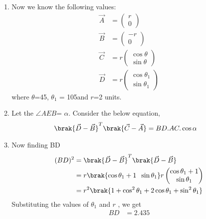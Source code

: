 \renewcommand{\theequation}{\theenumi}
\begin{enumerate}[label=\thesection.\arabic*.,ref=\thesection.\theenumi]
\item Now we know the following values:
\begin{align}
\vec{A} &= \begin{pmatrix}r\\0 \end{pmatrix} \\
\vec{B} &= \begin{pmatrix}-r\\0 \end{pmatrix} \\
\vec{C} &= r\begin{pmatrix}\cos\theta\\\sin\theta \end{pmatrix} \\
\vec{D} &= r\begin{pmatrix}\cos\theta_1\\\sin\theta_1 \end{pmatrix} 
\end{align}
where $\theta$=45\degree, $\theta_1$ = 105\degree and $r$=2 units.

\item Let the $\angle AEB$= $\alpha$. Consider the below equation,
\begin{align}
\brak{\vec{D}-\vec{B}}^T\brak{\vec{C} - \vec{A}} &= BD.AC.\cos\alpha
\label{eq:gen}
\end{align}

\item Now finding BD 
\begin{align}
(BD)^2 &= \brak{\vec{D}-\vec{B}}^T\brak{\vec{D}-\vec{B}} \\
       &= r\brak{\cos\theta_1+1 \hspace{0.2cm} \sin\theta_1} r\begin{pmatrix}
       \cos\theta_1+1 \\ \sin\theta_1
       \end{pmatrix} \\
    &= r^2 \brak{1+ \cos^2\theta_1 + 2\cos\theta_1 + \sin^2\theta_1}
\end{align}
Substituting the values of $\theta_1$ and $r$ , we get
\begin{align}
BD &= 2.435
\label{eq:BD}
\end{align}


\end{enumerate}
